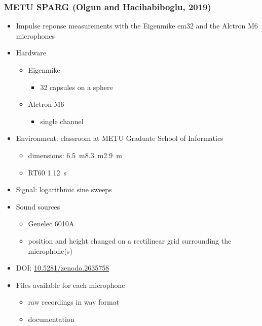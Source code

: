 \documentclass[14pt, oneside]{extarticle}
\begin{document}
\subsubsection{METU SPARG (Olgun and Hacihabiboglu, 2019)}

\begin{itemize}

\item Impulse reponse measurements with the Eigenmike em32 and the Alctron M6 microphones \cite{olgun2019metu}

\item Hardware
	\begin{itemize}
	\item Eigenmike
		\begin{itemize}
		\item 32 capsules on a sphere
		\end{itemize}
	\item Alctron M6
		\begin{itemize}
		\item single channel	
		\end{itemize}
	\end{itemize}

\item Environment: classroom at METU Graduate School of Informatics
	\begin{itemize}
	\item dimensions: \SI{6.5}{\metre}\texttimes\SI{8.3}{\metre}\texttimes\SI{2.9}{\metre}
	\item RT60 \SI{1.12}{\second} 
	\end{itemize}

\item Signal: logarithmic sine sweeps

\item Sound sources
	\begin{itemize}
	\item Genelec 6010A
	\item position and height changed on a rectilinear grid surrounding the microphone(s)
	\end{itemize}

\item DOI: \href{https://zenodo.org/record/2635758}{10.5281/zenodo.2635758} 

\item Files available for each microphone
	\begin{itemize}
	\item raw recordings in wav format
	\item documentation
	\end{itemize}

\end{itemize}
\end{document}

